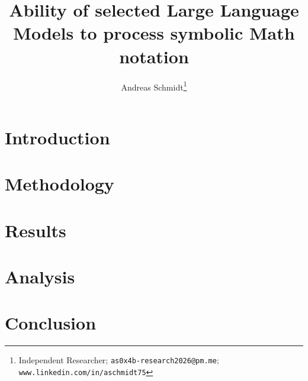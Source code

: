 \documentclass[
	a4paper, %
	10pt, %
	twoside, %
]{LTJournalArticle}
\title{Ability of selected Large Language Models to process symbolic Math notation} %
\author{%
	Andreas Schmidt\thanks{Independent Researcher; \texttt{as0x4b-research2026@pm.me}; \texttt{www.linkedin.com/in/aschmidt75}}
 }
\begin{document}
\maketitle %


\section{Introduction}



\section{Methodology}



\section{Results}



\section{Analysis}



\section{Conclusion}






\printbibliography %

\end{document}

